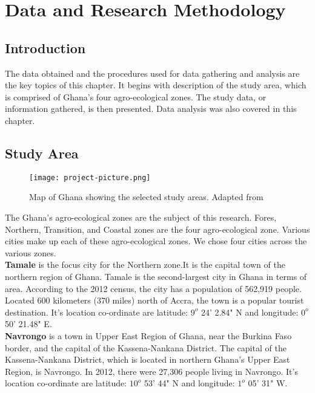 \label{chapter3}
\boldmath

\chapter{Data and Research Methodology}
\section{Introduction}
The data obtained and the procedures used for data gathering and analysis are the key topics of this chapter. It begins with description of the study area, which is comprised of Ghana's four agro-ecological zones. The study data, or information gathered, is then presented. Data analysis was also covered in this chapter.


\section{Study Area}
\begin{figure}[!ht]
	\centering
	\texttt{[image: project-picture.png]}
	\caption{Map of Ghana showing the selected study areas. Adapted from \cite{amekudzi2015variabilities}}
	\label{fig.1}
\end{figure}

The Ghana's agro-ecological zones are the subject of this research. Fores, Northern, Transition,  and Coastal zones are the four agro-ecological zone.
Various cities make up each of these agro-ecological zones. We chose four cities across the various zones.\\

\noindent \textbf{Tamale} is the focus city for the Northern zone.It is the capital town of the northern region of Ghana. Tamale is the second-largest city in Ghana in terms of area. According to the 2012 census, the city has a population of 562,919 people. Located 600 kilometers (370 miles) north of Accra, the town is a popular tourist destination. It's location co-ordinate are latitude: $9^o$ 24' 2.84" N and longitude: $0^o$ 50' 21.48" E.\\

\noindent \textbf{Navrongo}  is a town in Upper East Region of Ghana, near the Burkina Faso border, and the capital of the Kassena-Nankana District. The capital of the Kassena-Nankana District, which is located in northern Ghana's Upper East Region, is Navrongo. In 2012, there were 27,306 people living in Navrongo. It's location co-ordinate are latitude: $10^o$ 53' 44" N and longitude: $1^o$ 05' 31" W.\\

